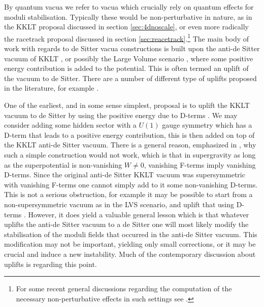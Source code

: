 \documentclass[11pt,a4paper]{article}
\numberwithin{equation}{section}
\numberwithin{table}{section}\setlength{\multlinegap}{25pt}
\begin{document}
{By quantum vacua we refer to vacua which crucially rely on quantum effects for moduli stabilisation. Typically these would be non-perturbative in nature, as in the KKLT proposal discussed in section \ref{sec:4dnoscale}, or even more radically the racetrack proposal discussed in section \ref{sec:reacetrack}.\footnote{For some recent general discussions regarding the computation of the necessary non-perturbative effects in such settings see \cite{Sethi:2017phn,Kachru:2018aqn}.} The main body of work with regards to de Sitter vacua constructions is built upon the anti-de Sitter vacuum of KKLT \cite{Kachru:2003aw}, or possibly the Large Volume scenario \cite{Balasubramanian:2005zx}, where some positive energy contribution is added to the potential. This is often termed an uplift of the vacuum to de Sitter. There are a number of different type of uplifts proposed in the literature, for example \cite{Burgess:2003ic,Saltman:2004sn,Lebedev:2006qq,Cremades:2007ig,Achucarro:2006zf,Villadoro:2005yq,Parameswaran:2006jh,Parameswaran:2007kf,Westphal:2006tn,Rummel:2011cd,Louis:2012nb,Cicoli:2012fh,Cicoli:2013cha,Aparicio:2014wxa,Cicoli:2015ylx,Kallosh:2018nrk,Kane:2019nod,Weissenbacher:2019mef}.

One of the earliest, and in some sense simplest, proposal is to uplift the KKLT vacuum to de Sitter by using the positive energy due to D-terms \cite{Burgess:2003ic}. We may consider adding some hidden sector with a $U(1)$ gauge symmetry which has a D-term that leads to a positive energy contribution, this is then added on top of the KKLT anti-de Sitter vacuum. There is a general reason, emphasized in \cite{deAlwis:2005tf}, why such a simple construction would not work, which is that in supergravity as long as the superpotential is non-vanishing $W \neq 0$, vanishing F-terms imply vanishing D-terms. Since the original anti-de Sitter KKLT vacuum was supersymmetric with vanishing F-terms one cannot simply add to it some non-vanishing D-terms. This is not a serious obstruction, for example it may be possible to start from a non-supersymmetric vacuum as in the LVS scenario, and uplift that using D-terms \cite{Cremades:2007ig,Cicoli:2012fh,Cicoli:2013cha,Aparicio:2014wxa,Cicoli:2015ylx}. However, it does yield a valuable general lesson which is that whatever uplifts the anti-de Sitter vacuum to a de Sitter one will most likely modify the stabilisation of the moduli fields that occurred in the anti-de Sitter vacuum. This modification may not be important, yielding only small corrections, or it may be crucial and induce a new instability. Much of the contemporary discussion about uplifts is regarding this point. 

}
\end{document}
